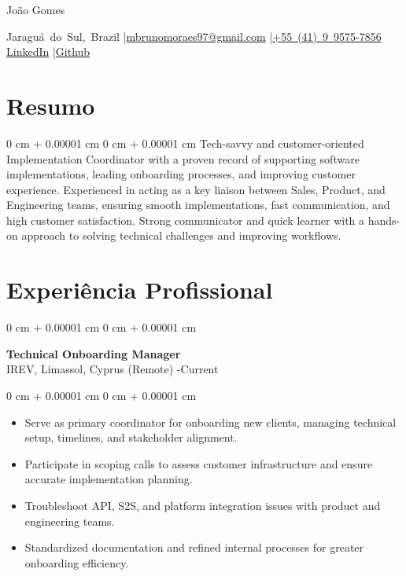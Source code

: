 \documentclass[10pt, letterpaper]{article}
\newenvironment{highlights}{
    \begin{itemize}[
        topsep=0.10 cm,
        parsep=0.10 cm,
        partopsep=0pt,
        itemsep=0pt,
        leftmargin=0 cm + 10pt
    ]
}{
    \end{itemize}
}
\newenvironment{onecolentry}{
    \begin{adjustwidth}{
        0 cm + 0.00001 cm
    }{
        0 cm + 0.00001 cm
    }
}{
    \end{adjustwidth}
}
\newenvironment{header}{
    \setlength{\topsep}{0pt}\par\kern\topsep\centering\linespread{1.5}
}{
    \par\kern\topsep
}
\begin{document}
\begin{header}
    {\fontsize{25pt}{25pt}\selectfont João Gomes}

    \vspace{0pt}

    \normalsize
    \mbox{Jaraguá do Sul, Brazil} \enskip|\enskip \mbox{\href{mailto:mbrunomoraes97@gmail.com}{mbrunomoraes97@gmail.com}} \enskip|\enskip \mbox{\href{tel:+55(41)995757856}{+55 (41) 9 9575-7856}} \\
    \mbox{\href{link do LinkedIn extraído}{LinkedIn}} \enskip|\enskip \mbox{\href{link do GitHub extraído}{Github}}
\end{header}

\vspace{5pt - 0.1cm}

\section{Resumo}
\begin{onecolentry}{Tech-savvy and customer-oriented Implementation Coordinator with a proven record of supporting software implementations, leading onboarding processes, and improving customer experience. Experienced in acting as a key liaison between Sales, Product, and Engineering teams, ensuring smooth implementations, fast communication, and high customer satisfaction. Strong communicator and quick learner with a hands-on approach to solving technical challenges and improving workflows.}\end{onecolentry}
\section{Experiência Profissional}

\begin{onecolentry}
    \setcolumnwidth{\fill, 4.5cm}
    \begin{paracol}{2}
        \textbf{Technical Onboarding Manager} \\ IREV, Limassol, Cyprus (Remote)
        \switchcolumn
        -Current
    \end{paracol}
\end{onecolentry}
\vspace{0.10cm}
\begin{onecolentry}
    \begin{highlights}
                \item Serve as primary coordinator for onboarding new clients, managing technical setup, timelines, and stakeholder alignment.
                \item Participate in scoping calls to assess customer infrastructure and ensure accurate implementation planning.
                \item Troubleshoot API, S2S, and platform integration issues with product and engineering teams.
                \item Standardized documentation and refined internal processes for greater onboarding efficiency.
    \end{highlights}
\end{onecolentry}
\end{document}
